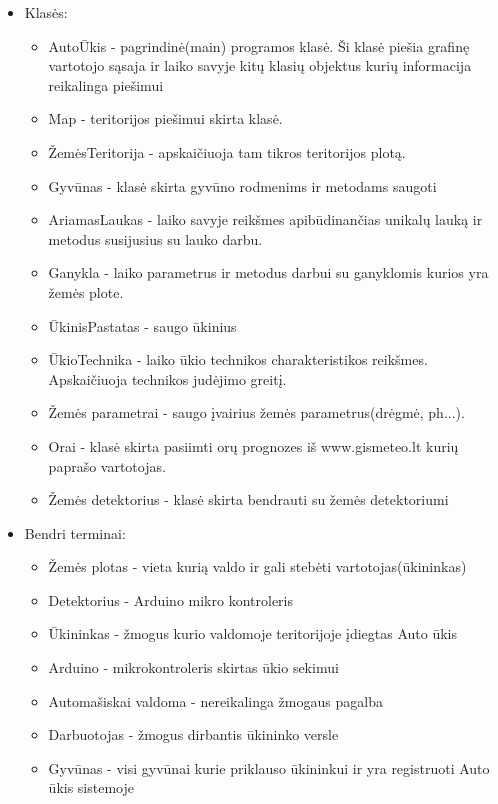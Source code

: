 \documentclass[oneside]{VUMIFPSkursinis}
\begin{document}
\begin{itemize}
	\item Klasės:
		\begin{itemize}
			\item AutoŪkis - pagrindinė(main) programos klasė. Ši klasė piešia grafinę vartotojo sąsaja ir laiko savyje kitų klasių objektus kurių informacija reikalinga piešimui
			\item Map - teritorijos piešimui skirta klasė.
			\item ŽemėsTeritorija - apskaičiuoja tam tikros teritorijos plotą.
 			\item Gyvūnas - klasė skirta gyvūno rodmenims ir metodams saugoti
			\item AriamasLaukas - laiko savyje reikšmes apibūdinančias unikalų lauką ir metodus susijusius su lauko darbu.
			\item Ganykla - laiko parametrus ir metodus darbui su ganyklomis kurios yra žemės plote.
			\item ŪkinisPastatas - saugo ūkinius 
			\item ŪkioTechnika - laiko ūkio technikos charakteristikos reikšmes. Apskaičiuoja technikos judėjimo greitį.
			\item Žemės parametrai - saugo įvairius žemės parametrus(drėgmė, ph...).
			\item Orai - klasė skirta pasiimti orų prognozes iš www.gismeteo.lt kurių paprašo vartotojas.
			\item Žemės detektorius - klasė skirta bendrauti su žemės detektoriumi

		\end{itemize}
	\item Bendri terminai:
		\begin{itemize}
			\item Žemės plotas - vieta kurią valdo ir gali stebėti vartotojas(ūkininkas) 
			\item Detektorius - Arduino mikro kontroleris
			\item Ūkininkas - žmogus kurio valdomoje teritorijoje įdiegtas Auto ūkis
			\item Arduino - mikrokontroleris skirtas ūkio sekimui
			\item Automašiskai valdoma - nereikalinga žmogaus pagalba
			\item Darbuotojas - žmogus dirbantis ūkininko versle
			\item Gyvūnas - visi gyvūnai kurie priklauso ūkininkui ir yra registruoti Auto ūkis sistemoje
		\end{itemize}
\end{itemize}
\end{document}
